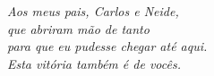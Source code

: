 \begin{dedicatoria}
   \vspace*{\fill}
   \begin{flushright}
      \textit{Aos meus pais, Carlos e Neide,\\
      que abriram mão de tanto\\
      para que eu pudesse chegar até aqui.\\
      Esta vitória também é de vocês.}
   \end{flushright}
\end{dedicatoria}